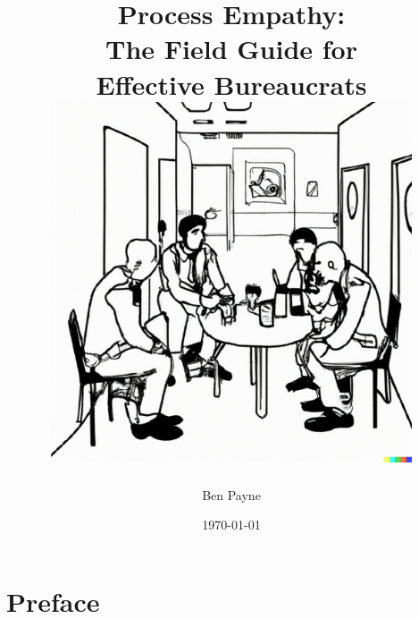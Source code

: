 \documentclass[openright]{book}
\title{\huge{Process Empathy:\\
The Field Guide for\\ Effective Bureaucrats}\\
\vfill
\includegraphics[width=0.8\textwidth]{images/bureaucrat_empathizing_with_coworkers_in_office_breakroom.pdf}
}
\author{\huge Ben Payne}
\date{\today}
\begin{document}





\begin{titlepage}
\maketitle
\thispagestyle{empty}
\end{titlepage}
\clearpage




\newif\ifhaspagenumbers
\haspagenumbersfalse

\frontmatter %

\clearpage

\dominitoc %
\hypertarget{contents}{}
\tableofcontents\label{sec:toc}

\chapter{Preface}

\mainmatter %

\end{document}
